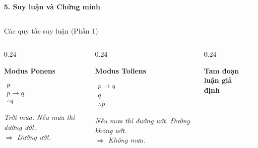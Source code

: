 \documentclass[aspectratio=169, 11pt]{beamer}
\begin{document}
\begin{frame}[plain]
  \centering
  \vspace*{2.2cm}
  {\Huge\textbf{\color{uitblue}5. Suy luận và Chứng minh}}
  \par\vspace{0.4cm}
  {\color{uitblue}\rule{0.55\textwidth}{1.2pt}}
\end{frame}

\begin{frame}{Các quy tắc suy luận (Phần 1)}
\begin{columns}[t, onlytextwidth]
  \begin{column}{0.24\textwidth}
    \centering
    \parbox[t][0.85cm][t]{\linewidth}{\centering\color{uitblue}\textbf{Modus Ponens}}\par
    \vspace{0.15cm}
    $\begin{array}{l}
      p \\
      p \rightarrow q \\
      \hline
      \therefore q
    \end{array}$\par
    \vspace{0.3cm}
    \footnotesize\textit{Trời mưa. Nếu mưa thì đường ướt.}\\
    $\Rightarrow$ \textit{Đường ướt.}
  \end{column}
  \begin{column}{0.24\textwidth}
    \centering
    \parbox[t][0.85cm][t]{\linewidth}{\centering\color{uitblue}\textbf{Modus Tollens}}\par
    \vspace{0.15cm}
    $\begin{array}{l}
      p \rightarrow q \\
      \bar{q} \\
      \hline
      \therefore \bar{p}
    \end{array}$\par
    \vspace{0.3cm}
    \footnotesize\textit{Nếu mưa thì đường ướt. Đường không ướt.}\\
    $\Rightarrow$ \textit{Không mưa.}
  \end{column}
  \begin{column}{0.24\textwidth}
    \centering
    \parbox[t][0.85cm][t]{\linewidth}{\centering\color{uitblue}\textbf{Tam đoạn luận giả\\ định}}\par
    \vspace{0.15cm}

\end{column}
\end{columns}
\end{frame}
\end{document}
